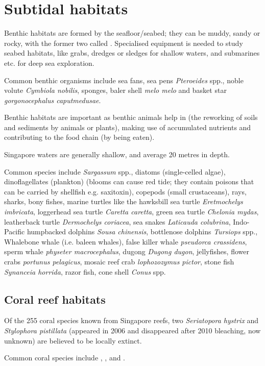 \documentclass{slnotes}
\newcommand{\scn}[1]{\textit{#1}}
\begin{document}
\chapter{Subtidal habitats}
Benthic habitats are formed by the seafloor/seabed; they can be muddy, sandy or rocky, with the former two called . Specialised equipment is needed to study seabed habitats, like grabs, dredges or sledges for shallow waters, and submarines etc. for deep sea exploration.

Common benthic organisms include sea fans, sea pens \scn{Pteroeides} spp., noble volute \scn{Cymbiola nobilis}, sponges, baler shell \scn{melo melo} and basket star \scn{gorgonocephalus caputmedusae}.

Benthic habitats are important as benthic animals help in  (the reworking of soils and sediments by animals or plants), making use of accumulated nutrients and contributing to the food chain (by being eaten).

Singapore waters are generally shallow, and average 20 metres in depth.

Common species include \scn{Sargassum} spp., diatoms (single-celled algae), dinoflagellates (plankton) (blooms can cause red tide; they contain poisons that can be carried by shellfish e.g. saxitoxin), copepods (small crustaceans), rays, sharks, bony fishes, marine turtles like the hawksbill sea turtle \scn{Eretmochelys imbricata}, loggerhead sea turtle \scn{Caretta caretta}, green sea turtle \scn{Chelonia mydas}, leatherback turtle \scn{Dermochelys coriacea}, sea snakes \scn{Laticauda colubrina}, Indo-Pacific humpbacked dolphins \scn{Sousa chinensis}, bottlenose dolphins \scn{Tursiops} spp., Whalebone whale (i.e. baleen whales), false killer whale \scn{pseudorca crassidens}, sperm whale \scn{physeter macrocephalus}, dugong \scn{Dugong dugon}, jellyfishes, flower crabs \scn{portunus pelagicus}, mosaic reef crab \scn{lophozozymus pictor}, stone fish \scn{Synanceia horrida}, razor fish, cone shell \scn{Conus} spp.
\section{Coral reef habitats}
Of the 255 coral species known from Singapore reefs, two \scn{Seriatopora hystrix} and \scn{Stylophora pistillata} (appeared in 2006 and disappeared after 2010 bleaching, now unknown) are believed to be locally extinct.

Common coral species include , ,  and .
\end{document}
